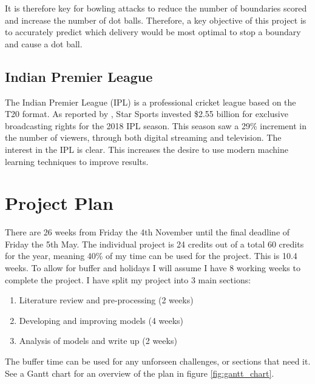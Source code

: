 \documentclass[12pt,a4paper]{report}
\theoremstyle{definition}
\begin{document}
It is therefore key for bowling attacks to reduce the number of boundaries scored and increase the number of dot balls.
Therefore, a key objective of this project is to accurately predict which delivery would be most optimal to stop a boundary and cause a dot ball.

\subsection{Indian Premier League} \label{sec:IPL}

The Indian Premier League (IPL) is a professional cricket league based on the T20 format.
As reported by \citet{ESPNcricinfo2018}, Star Sports invested \$2.55 billion for exclusive broadcasting rights for the 2018 IPL season. 
This season saw a 29\% increment in the number of viewers, through both digital streaming and television. 
The interest in the IPL is clear.
This increases the desire to use modern machine learning techniques to improve results.

\section{Project Plan}

There are 26 weeks from Friday the 4th November until the final deadline of Friday the 5th May. 
The individual project is 24 credits out of a total 60 credits for the year, meaning 40\% of my time can be used for the project. 
This is 10.4 weeks. 
To allow for buffer and holidays I will assume I have 8 working weeks to complete the project. 
I have split my project into 3 main sections:

\begin{enumerate}
    \item Literature review and pre-processing (2 weeks)
    \item Developing and improving models (4 weeks)
    \item Analysis of models and write up (2 weeks)
\end{enumerate}

The buffer time can be used for any unforseen challenges, or sections that need it. 
See a Gantt chart for an overview of the plan in figure \ref{fig:gantt_chart}.
\end{document}
